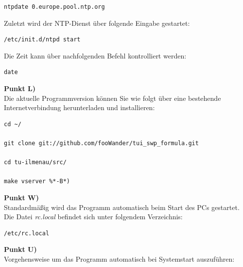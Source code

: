 \documentclass[fontsize = 12pt, paper = a4]{scrreprt}
\begin{document}
\vspace*{4mm}
\begin{lstlisting}[frame=single]
ntpdate 0.europe.pool.ntp.org
\end{lstlisting} 
\vspace*{-2mm}

Zuletzt wird der NTP-Dienst über folgende Eingabe gestartet: 

\vspace*{4mm}
\begin{lstlisting}[frame=single]
/etc/init.d/ntpd start
\end{lstlisting} 
\vspace*{-2mm}

Die Zeit kann über nachfolgenden Befehl kontrolliert werden:

\vspace*{4mm}
\begin{lstlisting}[frame=single]
date
\end{lstlisting} 
\vspace*{-2mm}

\textbf{Punkt L)} \\

Die aktuelle Programmversion können Sie wie folgt über eine bestehende Internetverbindung herunterladen und installieren:

\vspace*{4mm}
\begin{lstlisting}[frame=single]
cd ~/
 
git clone git://github.com/fooWander/tui_swp_formula.git

cd tu-ilmenau/src/

make vserver %*-B*)
\end{lstlisting} 
\vspace*{-2mm}

\textbf{Punkt W)} \\

Standardmäßig wird das Programm automatisch beim Start des PCs gestartet. Die Datei \textit{rc.local} befindet sich unter folgendem Verzeichnis:

\vspace*{4mm}
\begin{lstlisting}[frame=single]
/etc/rc.local
\end{lstlisting} 
\vspace*{-2mm}

\textbf{Punkt U)} \\

Vorgehensweise um das Programm automatisch bei Systemstart auszuführen:
\end{document}
